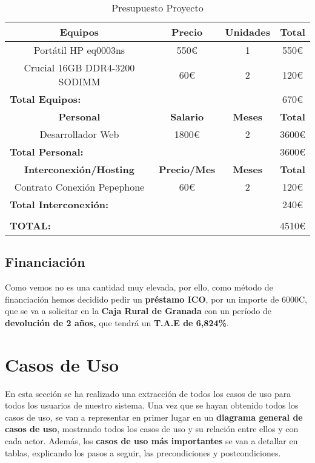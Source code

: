 \begin{table}[H]
	\begin{center}
		\bgroup
		\def\arraystretch{1.5}
		\begin{tabular}{| c | c | c | c |}
			\hline
			\textbf{Equipos} & \textbf{Precio} &  \textbf{Unidades} & \textbf{Total} \\ \hline
			Portátil  HP eq0003ns & 550€ & 1 & 550€ \\ \hline
			Crucial 16GB DDR4-3200 SODIMM & 60€ & 2 & 120€ \\ \hline
			\multicolumn{3}{|l|}{\textbf{Total Equipos:}} & 670€ \\ \hline
			\textbf{Personal} & \textbf{Salario} &  \textbf{Meses} & \textbf{Total} \\ \hline
			Desarrollador Web & 1800€ & 2 & 3600€ \\ \hline
			\multicolumn{3}{|l|}{\textbf{Total Personal:}} & 3600€ \\ \hline
			\textbf{Interconexión/Hosting} & \textbf{Precio/Mes} &  \textbf{Meses} & \textbf{Total} \\ \hline
			Contrato Conexión Pepephone & 60€ & 2 & 120€ \\ \hline
			\multicolumn{3}{|l|}{\textbf{Total Interconexión:}} & 240€ \\ \hline
			\multicolumn{4}{|l|}{\textbf{}}\\ \hline
			\multicolumn{3}{|l|}{\textbf{TOTAL:}} & 4510€ \\ \hline			
		\end{tabular}	
		\egroup
		\caption{Presupuesto Proyecto}
	\end{center}
\end{table}

\subsection{Financiación}
Como vemos no es una cantidad muy elevada, por ello, como método de financiación hemos decidido pedir un \textbf{préstamo ICO}, por un importe de 6000C, que se va a solicitar en la \textbf{Caja Rural de Granada} con un período de \textbf{devolución de 2 años,} que tendrá un \textbf{T.A.E de 6,824\%}. \cite{ico01} 

\section{Casos de Uso}
En esta sección se ha realizado una extracción de todos los casos de uso para todos los usuarios de nuestro sistema. Una vez que se hayan obtenido todos los casos de uso, se van a representar en primer lugar en un \textbf{diagrama general de casos de uso}, mostrando todos los casos de uso y su relación entre ellos y con cada actor. Además, los \textbf{casos de uso más importantes} se van a detallar en tablas, explicando los pasos a seguir, las precondiciones y postcondiciones.

